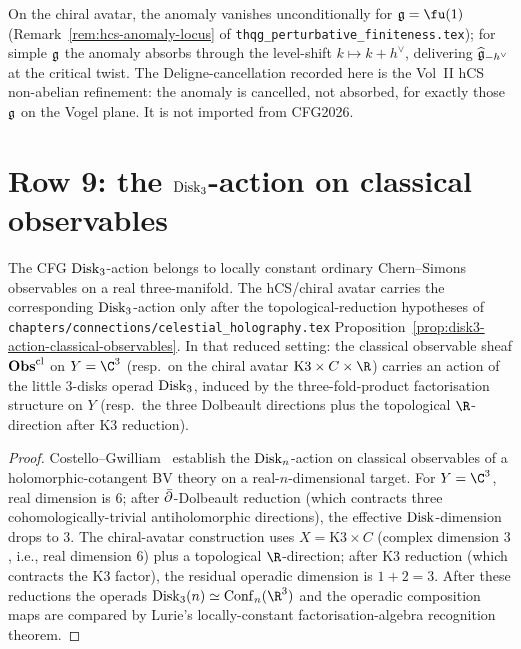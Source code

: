 \begin{remark}
\label{rem:cfg-row-8-dichotomy}
On the chiral avatar, the anomaly vanishes unconditionally for
$\fg = \fu(1)$ (Remark~\ref{rem:hcs-anomaly-locus} of
\texttt{thqg\_perturbative\_finiteness.tex}); for simple $\mathfrak{g}$ the
anomaly absorbs through the level-shift
$k\mapsto k + h^\vee$, delivering $\widehat{\mathfrak{g}}_{-h^\vee}$ at the
critical twist. The Deligne-cancellation recorded here is the Vol~II
hCS non-abelian refinement: the anomaly is cancelled, not absorbed, for
exactly those $\mathfrak{g}$ on the Vogel plane. It is not imported from
CFG2026.
\end{remark}

\section{\texorpdfstring{Row 9: the $\mathrm{Disk}_3$-action on classical observables}{Row 9: the Disk 3 action on classical observables}}
\label{sec:cfg-row-9-disk3}

\begin{theorem}
\label{thm:cfg-row-9}
The CFG $\mathrm{Disk}_3$-action belongs to locally constant ordinary
Chern--Simons observables on a real three-manifold. The hCS/chiral
avatar carries the corresponding $\mathrm{Disk}_3$-action only after the
topological-reduction hypotheses of
\texttt{chapters/connections/celestial\_holography.tex}
Proposition~\ref{prop:disk3-action-classical-observables}. In that
reduced setting:
the classical observable sheaf $\mathbf{Obs}^{\mathrm{cl}}$ on $Y = \C^3$
(resp.\ on the chiral avatar $\mathrm{K3}\times C\times\R$) carries an
action of the little $3$-disks operad $\mathrm{Disk}_3$, induced by the
three-fold-product factorisation structure on $Y$ (resp.\ the three
Dolbeault directions plus the topological $\R$-direction after K3
reduction).
\end{theorem}

\begin{proof}
Costello--Gwilliam~\cite[Ch.~4, Thm.~4.4.1]{CG17} establish the
$\mathrm{Disk}_{n}$-action on classical observables of a holomorphic-cotangent
BV theory on a real-$n$-dimensional target. For $Y = \C^3$, real
dimension is $6$; after $\bar\partial$-Dolbeault reduction (which contracts
three cohomologically-trivial antiholomorphic directions), the
effective $\mathrm{Disk}$-dimension drops to $3$. The chiral-avatar construction
uses $X = \mathrm{K3}\times C$ (complex dimension $3$, i.e., real
dimension $6$) plus a topological $\R$-direction; after K3 reduction
(which contracts the K3 factor), the residual operadic dimension is
$1 + 2 = 3$. After these reductions the operads
$\Disk_3(n)\simeq \Conf_n(\R^3)$ and the operadic composition maps
are compared by Lurie's locally-constant factorisation-algebra
recognition theorem.
\end{proof}

